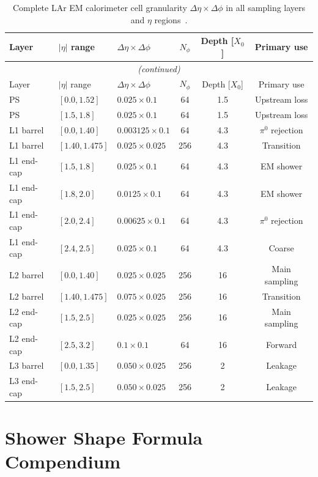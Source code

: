 \documentclass[11pt,a4paper]{article}
\begin{document}
\begin{longtable}{lllccc}
  \caption{Complete LAr EM calorimeter cell granularity
           $\Delta\eta \times \Delta\phi$ in all sampling layers
           and $\eta$ regions~\cite{ATLAS:2008,LArTDR:1996}.}
  \label{tab:granularity_full}\\
  \toprule
  Layer & $|\eta|$ range & $\Delta\eta \times \Delta\phi$ &
  $N_\phi$ & Depth [$X_0$] & Primary use \\
  \midrule
  \endfirsthead
  \multicolumn{6}{c}{\small\itshape (continued)}\\
  \toprule
  Layer & $|\eta|$ range & $\Delta\eta \times \Delta\phi$ &
  $N_\phi$ & Depth [$X_0$] & Primary use \\
  \midrule
  \endhead
  \bottomrule
  \endfoot
  PS & $[0.0, 1.52]$ & $0.025\times0.1$ & 64 & 1.5 & Upstream loss \\
  PS & $[1.5, 1.8]$ & $0.025\times0.1$ & 64 & 1.5 & Upstream loss \\
  \midrule
  L1 barrel & $[0.0, 1.40]$ & $0.003125\times0.1$ & 64 & 4.3 & $\pi^0$ rejection \\
  L1 barrel & $[1.40, 1.475]$ & $0.025\times0.025$ & 256 & 4.3 & Transition \\
  L1 end-cap & $[1.5, 1.8]$ & $0.025\times0.1$ & 64 & 4.3 & EM shower \\
  L1 end-cap & $[1.8, 2.0]$ & $0.0125\times0.1$ & 64 & 4.3 & EM shower \\
  L1 end-cap & $[2.0, 2.4]$ & $0.00625\times0.1$ & 64 & 4.3 & $\pi^0$ rejection \\
  L1 end-cap & $[2.4, 2.5]$ & $0.025\times0.1$ & 64 & 4.3 & Coarse \\
  \midrule
  L2 barrel & $[0.0, 1.40]$ & $0.025\times0.025$ & 256 & 16 & Main sampling \\
  L2 barrel & $[1.40, 1.475]$ & $0.075\times0.025$ & 256 & 16 & Transition \\
  L2 end-cap & $[1.5, 2.5]$ & $0.025\times0.025$ & 256 & 16 & Main sampling \\
  L2 end-cap & $[2.5, 3.2]$ & $0.1\times0.1$ & 64 & 16 & Forward \\
  \midrule
  L3 barrel & $[0.0, 1.35]$ & $0.050\times0.025$ & 256 & 2 & Leakage \\
  L3 end-cap & $[1.5, 2.5]$ & $0.050\times0.025$ & 256 & 2 & Leakage \\
\end{longtable}

\section{Shower Shape Formula Compendium}
\label{app:formulas}
\end{document}

